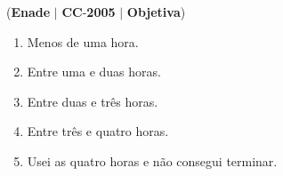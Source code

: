 \documentclass{exam}
\begin{document}
\begin{questions}
\question (\textbf{Enade} $|$ \textbf{CC}-\textbf{2005} $|$ \textbf{Objetiva})
	\begin{enumerate}[label=\alph*)]
		\item  Menos de uma hora.
		\item  Entre uma e duas horas.
		\item  Entre duas e três horas.
		\item  Entre três e quatro horas.
		\item  Usei as quatro horas e não consegui terminar.
	\end{enumerate}

\end{questions}
\end{document}
